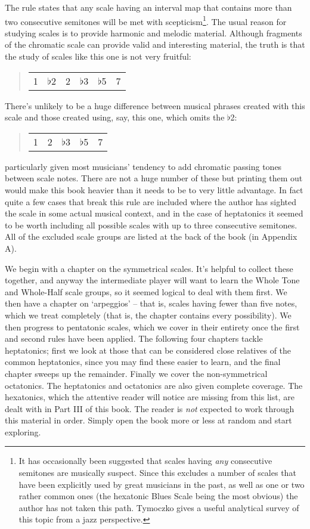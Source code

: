 \documentclass[english]{./gbook}
\begin{document}
\begin{large}
The rule states that any scale having an interval map that contains more than two consecutive semitones will be met with scepticism\footnote{It has occasionally been suggested that scales having \emph{any} consecutive semitones are musically suspect. Since this excludes a number of scales that have been explicitly used by great musicians in the past, as well as one or two rather common ones (the hexatonic Blues Scale being the most obvious) the author has not taken this path. Tymoczko gives a useful analytical survey of this topic from a jazz perspective.}. The usual reason for studying scales is to provide harmonic and melodic material. Although fragments of the chromatic scale can provide valid and interesting material, the truth is that the study of scales like this one is not very fruitful:
\begin{quote}
\begin{tabular}{rrrrrr}
1	&$\flat$2	&2	&$\flat$3	&$\flat$5	&7
\end{tabular}
\end{quote}
There's unlikely to be a huge difference between musical phrases created with this scale and those created using, say, this one, which omits the $\flat$2: 
\begin{quote}
\begin{tabular}{rrrrr}
1	&2	&$\flat$3	&$\flat$5	&7
\end{tabular}
\end{quote}
particularly given most musicians' tendency to add chromatic passing tones between scale notes. There are not a huge number of these but printing them out would make this book heavier than it needs to be to very little advantage. In fact quite a few cases that break this rule are included where the author has sighted the scale in some actual musical context, and in the case of heptatonics it seemed to be worth including all possible scales with up to three consecutive semitones. All of the excluded scale groups are listed at the back of the book (in Appendix A).

We begin with a chapter on the symmetrical scales. It's helpful to collect these together, and anyway the intermediate player will want to learn the Whole Tone and Whole-Half scale groups, so it seemed logical to deal with them first. We then have a chapter on `arpeggios' -- that is, scales having fewer than five notes, which we treat completely (that is, the chapter contains every possibility). We then progress to pentatonic scales, which we cover in their entirety once the first and second rules have been applied. The following four chapters tackle heptatonics; first we look at those that can be considered close relatives of the common heptatonics, since you may find these easier to learn, and the final chapter sweeps up the remainder. Finally we cover the non-symmetrical octatonics. The heptatonics and octatonics are also given complete coverage. The hexatonics, which the attentive reader will notice are missing from this list, are dealt with in Part III of this book. The reader is \emph{not} expected to work through this material in order. Simply open the book more or less at random and start exploring.



\end{large}
\end{document}
